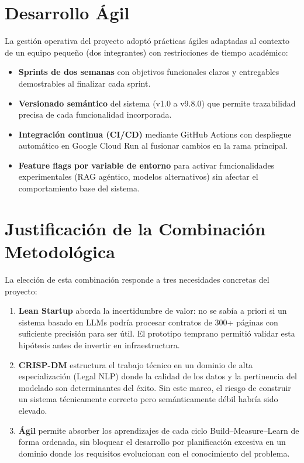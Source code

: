\section{Desarrollo Ágil}

La gestión operativa del proyecto adoptó prácticas ágiles adaptadas al
contexto de un equipo pequeño (dos integrantes) con restricciones de tiempo
académico:

\begin{itemize}
    \item \textbf{Sprints de dos semanas} con objetivos funcionales claros y
    entregables demostrables al finalizar cada sprint.
    \item \textbf{Versionado semántico} del sistema (v1.0 a v9.8.0) que
    permite trazabilidad precisa de cada funcionalidad incorporada.
    \item \textbf{Integración continua (CI/CD)} mediante GitHub Actions con
    despliegue automático en Google Cloud Run al fusionar cambios en la rama
    principal.
    \item \textbf{Feature flags por variable de entorno} para activar
    funcionalidades experimentales (RAG agéntico, modelos alternativos) sin
    afectar el comportamiento base del sistema.
\end{itemize}

\section{Justificación de la Combinación Metodológica}

La elección de esta combinación responde a tres necesidades concretas del
proyecto:

\begin{enumerate}
    \item \textbf{Lean Startup} aborda la incertidumbre de valor: no se sabía
    a priori si un sistema basado en LLMs podría procesar contratos de 300+
    páginas con suficiente precisión para ser útil. El prototipo temprano
    permitió validar esta hipótesis antes de invertir en infraestructura.
    \item \textbf{CRISP-DM} estructura el trabajo técnico en un dominio de
    alta especialización (Legal NLP) donde la calidad de los datos y la
    pertinencia del modelado son determinantes del éxito. Sin este marco,
    el riesgo de construir un sistema técnicamente correcto pero semánticamente
    débil habría sido elevado.
    \item \textbf{Ágil} permite absorber los aprendizajes de cada ciclo
    Build--Measure--Learn de forma ordenada, sin bloquear el desarrollo por
    planificación excesiva en un dominio donde los requisitos evolucionan con
    el conocimiento del problema.
\end{enumerate}